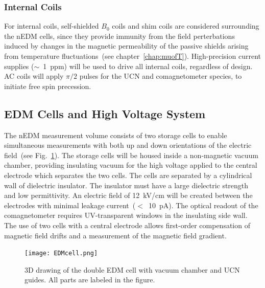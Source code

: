 \subsubsection{Internal Coils}
For internal coils, self-shielded $B_0$ coils and shim coils are
considered surrounding the nEDM cells, since they provide immunity
from the field perterbations induced by changes in the magnetic
permeability of the passive shields arising from temperature
fluctuations~(see chapter~\ref{chap:muofT}).  High-precision current
supplies ($\sim$~1~ppm) will be used to drive all internal coils,
regardless of design. AC coils will apply $\pi/2$ pulses for the UCN
and comagnetometer species, to initiate free spin precession.



\subsection{ EDM Cells and High Voltage System}
The nEDM measurement volume consists of two storage cells to enable
simultaneous measurements with both up and down orientations of the
electric field~(see Fig.~\ref{fig:HVcell}). The storage cells will be
housed inside a non-magnetic vacuum chamber, providing insulating
vacuum for the high voltage applied to the central electrode which
separates the two cells. The cells are separated by a cylindrical
wall of dielectric insulator. The insulator must have a large
dielectric strength and low permittivity. An electric field of
12~kV/cm will be created between the electrodes with minimal leakage
current~($<$~10~pA). The optical readout of the comagnetometer
requires UV-transparent windows in the insulating side wall. The use
of two cells with a central electrode allows first-order compensation
of magnetic field drifts and a measurement of the magnetic field
gradient.

\begin{figure}[h!]
  \centering
  \texttt{[image: EDMcell.png]}
  \caption[3D drawing of TUCAN's double EDM cell]{3D drawing of the
    double EDM cell with vacuum chamber and UCN guides. All parts are
    labeled in the figure.}
  \label{fig:HVcell}
\end{figure}



